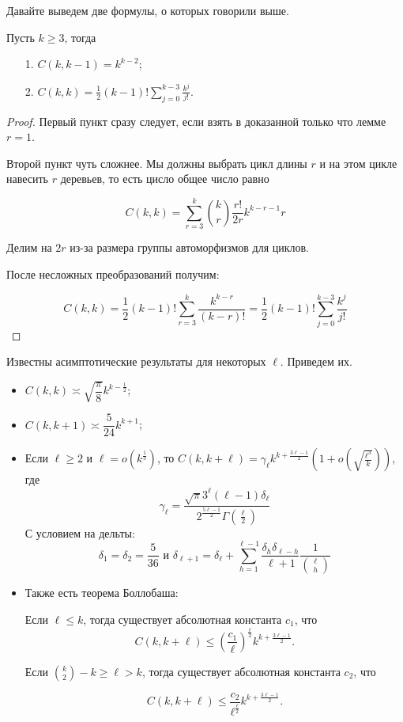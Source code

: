 Давайте выведем две формулы, о которых говорили выше.

\begin{lemma}
  Пусть $k \geq 3$, тогда 
  \begin{itemize}
    \item[1.] $C(k, k - 1) = k^{k - 2}$;
    \item[2.] $C(k, k) = \frac12 (k - 1)! \sum\limits_{j = 0}^{k - 3} \frac{k^j}{j!}$.
  \end{itemize}
\end{lemma}

\begin{proof}
  Первый пункт сразу следует, если взять в доказанной только что лемме $r = 1$.

  Второй пункт чуть сложнее. Мы должны выбрать цикл длины $r$ 
  и на этом цикле навесить $r$ деревьев,
  то есть цисло общее число равно

  \[
    C(k, k) = \sum\limits_{r = 3}^k \binom{k}{r} \frac{r!}{2r} k^{k - r - 1}r
  \]

  Делим на $2r$ из-за размера группы автоморфизмов для циклов.

  После несложных преобразований получим:

  \[
    C(k, k) = \frac12 (k - 1)! \sum\limits_{r = 3}^k \frac{k^{k - r}}{(k - r)!}
    = \frac12 (k - 1)! \sum\limits_{j = 0}^{k - 3} \frac{k^j}{j!}
  \]
\end{proof}

Известны асимптотические результаты для некоторых $\ell$. Приведем их.

\begin{itemize}
  \item $C(k, k) \asymp \sqrt{\dfrac{\pi}{8}}k^{k - \frac12}$;
  \item $C(k, k + 1) \asymp \dfrac{5}{24} k^{k + 1}$;
  \item Если $\ell \geq 2$ и $\ell = o\left(k^{\frac13}\right)$, то $C(k, k + \ell) =
  \gamma_{\ell} k^{k + \frac{3\ell - 1}{2}}
  \left(1 + o\left(\sqrt{\frac{\ell^3}{k}}\right)\right)$, где
  $$\gamma_{\ell} = \dfrac{\sqrt{\pi} 3^{\ell}(\ell - 1)\delta_{\ell}}{2^{\frac{5\ell -1}{2}} 
  \Gamma\left(\frac{\ell}{2}\right)}$$ С условием на дельты: $$\delta_1 = \delta_2 = \frac{5}{36} \text{ и }
  \delta_{\ell + 1} = \delta_{\ell} + \sum\limits_{h = 1}^{\ell - 1} 
  \frac{\delta_h \delta_{\ell - h}}{\ell + 1} \frac{1}{\binom{\ell}{h}}$$

  \item Также есть теорема Боллобаша:

  Если $\ell \leq k$, тогда существует абсолютная константа $c_1$, что 
  \[
    C(k, k + \ell) \leq \left(\dfrac{c_1}{\ell}\right)^{
    \frac{\ell}{2}} k^{k + \frac{3\ell - 1}{2}}.
  \]

  Если $\binom{k}{2} - k \geq \ell > k$, тогда существует абсолютная константа $c_2$, что

  \[
    C(k, k + \ell) \leq \frac{c_2}{\ell^{\frac{\ell}{2}}} 
    k^{k + \frac{3\ell - 1}{2}}.
  \]
\end{itemize}


